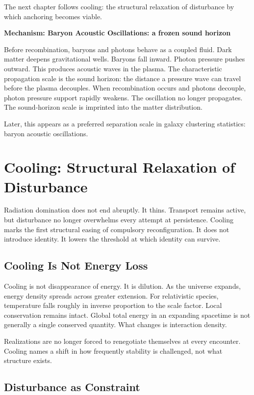 \documentclass[11pt,twoside,openright]{book}
\newenvironment{mechanismbox}[1]
  {\begin{framed}\noindent\textbf{Mechanism: #1}\par\medskip}
  {\end{framed}}
\begin{document}
The next chapter follows cooling: the structural relaxation of disturbance by which anchoring becomes viable.

\begin{mechanismbox}{Baryon Acoustic Oscillations: a frozen sound horizon}

Before recombination, baryons and photons behave as a coupled fluid. Dark matter deepens gravitational wells. Baryons fall inward. Photon pressure pushes outward. This produces acoustic waves in the plasma. The characteristic propagation scale is the sound horizon: the distance a pressure wave can travel before the plasma decouples. When recombination occurs and photons decouple, photon pressure support rapidly weakens. The oscillation no longer propagates. The sound-horizon scale is imprinted into the matter distribution.

Later, this appears as a preferred separation scale in galaxy clustering statistics: baryon acoustic oscillations.

\end{mechanismbox}
\chapter{Cooling: Structural Relaxation of Disturbance}

Radiation domination does not end abruptly. It thins. Transport remains active, but disturbance no longer overwhelms every attempt at persistence. Cooling marks the first structural easing of compulsory reconfiguration. It does not introduce identity. It lowers the threshold at which identity can survive.

\section*{Cooling Is Not Energy Loss}

Cooling is not disappearance of energy. It is dilution. As the universe expands, energy density spreads across greater extension. For relativistic species, temperature falls roughly in inverse proportion to the scale factor. Local conservation remains intact. Global total energy in an expanding spacetime is not generally a single conserved quantity. What changes is interaction density.

Realizations are no longer forced to renegotiate themselves at every encounter. Cooling names a shift in how frequently stability is challenged, not what structure exists.

\section*{Disturbance as Constraint}
\end{document}
